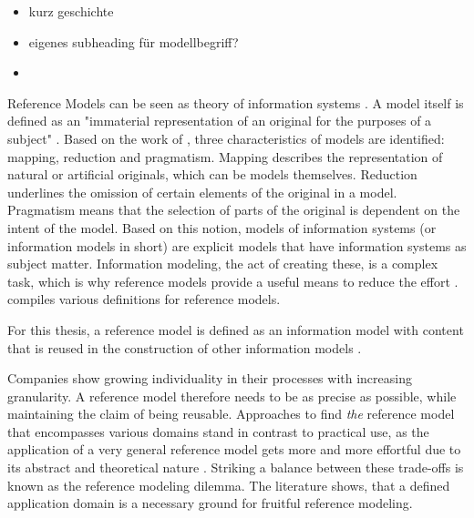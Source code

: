 		\begin{itemize}
			\item kurz geschichte
			\item eigenes subheading für modellbegriff?
			\item 
		\end{itemize}
		Reference Models can be seen as theory of information systems \cite{Schutte1998}. A model itself is defined as an "immaterial representation of an original for the purposes of a subject" \citep[]{Becker2012Gom}. Based on the work of \cite{Stachowiak1973}, three characteristics of models are identified: mapping, reduction and pragmatism.  Mapping describes the representation of natural or artificial originals, which can be models themselves. Reduction underlines the omission of certain elements of the original in a model. Pragmatism means that the selection of parts of the original is dependent on the intent of the model. Based on this notion, models of information systems (or information models in short) are explicit models that have information systems as subject matter. Information modeling, the act of creating these, is a complex task, which is why reference models provide a useful means to reduce the effort \cite{Becker2007}. \cite{thomas2006refmod} compiles various definitions for reference models. 
		
		For this thesis, a reference model is defined as an information model with content that is reused in the construction of other information models \cite{Becker2004}.
		
		Companies show growing individuality in their processes with increasing granularity. A reference model therefore needs to be as precise as possible, while maintaining the claim of being reusable. Approaches to find \textit{the} reference model that encompasses various domains stand in contrast to practical use, as the application of a very general reference model gets more and more effortful due to its abstract and theoretical nature \citep[]{Schutte1998}. Striking a balance between these trade-offs is known as the reference modeling dilemma. The literature shows, that a defined application domain is a necessary ground for fruitful reference modeling.
		
		  
